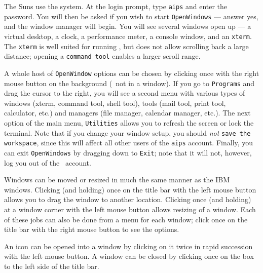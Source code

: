 
     The  Suns use the {\tt {}} system.  At
the login prompt, type {\tt aips} and enter the password.  You will
then be asked if you wish to start {\tt OpenWindows} --- answer yes,
and the window manager will begin.  You will see several windows open
up --- a virtual desktop, a clock, a performance meter, a console
window, and an {\tt xterm}.  The {\tt xterm} is well suited for
running \AIPS, but does not allow scrolling back a large distance;
opening a {\tt command tool} enables a larger scroll range.

     A whole host of {\tt OpenWindow} options can be chosen by
clicking once with the right mouse button on the background (\ie\ not
in a window).  If you go to {\tt Programs} and drag the cursor to the
right, you will see a second menu with various types of windows
(xterm, command tool, shell tool), tools (mail tool, print tool,
calculator, etc.) and managers (file manager, calendar manager, etc.).
The next option of the main menu, {\tt Utilities} allows you to
refresh the screen or lock the terminal.  Note that if you change your
window setup, you should {\it not} {\tt save the workspace}, since
this will affect all other users of the {\tt aips} account.  Finally,
you can exit {\tt OpenWindows} by dragging down to {\tt Exit}; note
that it will not, however, log you out of the \AIPS\ account.

     Windows can be moved or resized in much the same manner as the
IBM windows.  Clicking (and holding) once on the title bar with the
left mouse button allows you to drag the window to another location.
Clicking once (and holding) at a window corner with the left mouse
button allows resizing of a window.  Each of these jobs can also be
done from a menu for each window; click once on the title bar with the
right mouse button to see the options.

     An icon can be opened into a window by clicking on it twice in
rapid succession with the left mouse button. A window can be closed by
clicking once on the box to the left side of the title bar.


